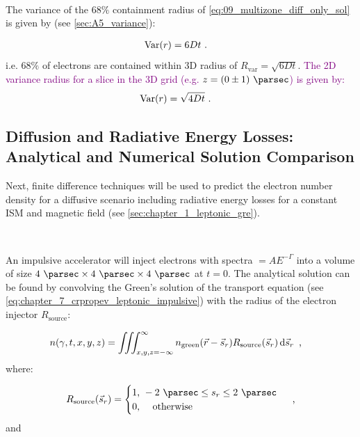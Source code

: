 \par~\par 
The variance of the $68\%$ containment radius of \autoref{eq:09_multizone_diff_only_sol} is given by (see \autoref{sec:A5_variance}):

\begin{equation}
	\begin{aligned}
		\mathrm{Var}\qty(r)&=6Dt\text{ .} 
	\end{aligned}
\end{equation}
\noindent i.e. $68\%$ of electrons are contained within 3D radius of $R_\text{var}=\sqrt{6Dt}$. \textcolor{purple}{The 2D variance radius for a slice in the 3D grid (e.g. $z=(0\pm 1)~\pc$) is given by:}
\begin{equation}
	\begin{aligned}
		\mathrm{Var}\qty(r)&=\sqrt{4Dt}\text{ .} 
	\end{aligned}
\end{equation}


\subsection{Diffusion and Radiative Energy Losses: Analytical and Numerical Solution Comparison}

Next, finite difference techniques will be used to predict the electron number density for a diffusive scenario including radiative energy losses for a constant ISM and magnetic field (see \autoref{sec:chapter_1_leptonic_gre}).
\par~\par
An impulsive accelerator will inject electrons with spectra $=AE^{-\Gamma}$ into a volume of size $4~\pc \times 4~\pc \times 4~\pc$ at $t=0$. The analytical solution can be found by convolving the Green's solution of the transport equation (see \autoref{eq:chapter_7_crpropev_leptonic_impulsive}) with the radius of the electron injector $R_\text{source}$:

\begin{equation}
	\begin{aligned}
		n\qty(\gamma,t,x,y,z)&=\iiint_{x,y,z=-\infty}^{\infty} n_\text{green}\qty(\vec{r}-\vec{s}_r)R_\text{source}\qty(\vec{s}_r)\dd{\vec{s}_r} \text{ ,} 
	\end{aligned} \label{eq:chapter_9_multizone_diff_exact}
\end{equation}
\noindent where:

\begin{equation}
    \begin{aligned}
    R_\text{source}\qty(\vec{s}_r)=
    \begin{cases}
    1\text{, }-2~\pc\leq s_r\leq 2~\pc \\
    0\text{, }\quad\text{otherwise}
    \end{cases}\text{ ,} 
    \end{aligned} \label{eq:09_multizone_source_func}
\end{equation}
\noindent and

